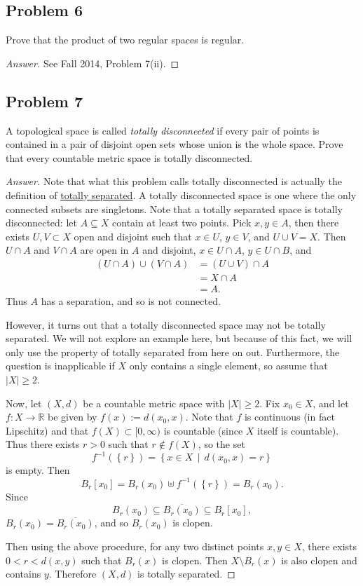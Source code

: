 \documentclass[12pt]{article}
\newcommand{\real}{\mathbb{R}}
\newcommand{\ita}[1]{\textit{#1}}
\newcommand\inv[1]{#1^{-1}}
\newcommand\paren[1]{\left( #1 \right)}
\newcommand\setb[1]{\left \{ #1 \right \}}
\newcommand{\sqbrack}[1]{\left [ #1 \right ]}
\theoremstyle{definition}
\begin{document}
\subsection{Problem 6}
Prove that the product of two regular spaces is regular.
\begin{proof}[Answer]
    See Fall 2014, Problem 7(ii).
\end{proof}
\subsection{Problem 7 \texorpdfstring{\cite{Arthur}}{}}
A topological space is called \ita{totally disconnected} if every pair of points is contained in a pair of disjoint open sets whose union is the whole space. Prove that every countable metric space is totally disconnected.
\begin{proof}[Answer]
    Note that what this problem calls totally disconnected is actually the definition of \underline{totally separated}. A totally disconnected space is one where the only connected subsets are singletons. Note that a totally separated space is totally disconnected: let $A \subseteq X$ contain at least two points. Pick $x , y \in A$, then there exists $U , V \subset X$ open and disjoint such that $x \in U$, $y \in V$, and $U \cup V = X$. Then $U \cap A$ and $V \cap A$ are open in $A$ and disjoint, $x \in U \cap A$, $y \in U \cap B$, and 
    \begin{align*}
        \paren{ U \cap A } \cup \paren{ V \cap A } & = \paren{ U \cup V } \cap A \\
        & = X \cap A \\
        & = A.
    \end{align*}
    Thus $A$ has a separation, and so is not connected. 
    
    However, it turns out that a totally disconnected space may not be totally separated. We will not explore an example here, but because of this fact, we will only use the property of totally separated from here on out. Furthermore, the question is inapplicable if $X$ only contains a single element, so assume that $|X| \geq 2$.
    
    Now, let $(X,d)$ be a countable metric space with $|X| \geq 2$. Fix $x_0 \in X$, and let $f : X \to \real$ be given by $f(x) := d \paren{ x_0 , x }$. Note that $f$ is continuous (in fact Lipschitz) and that $f(X) \subset [0,\infty)$ is countable (since $X$ itself is countable). Thus there exists $r > 0$ such that $r \notin f(X)$, so the set 
    \[
        \inv{f} \paren{ \setb{ r } } = \setb{ x \in X \, \middle| \, d \paren{ x_0 , x } = r }
    \]
    is empty. Then 
    \[
        B_r \sqbrack{ x_0 } = B_r \paren{ x_0 } \uplus \inv{f} \paren{ \setb{ r } } = B_r \paren{ x_0 }.
    \]
    Since 
    \[
        B_r \paren{ x_0 } \subseteq \overline{ B_r \paren{ x_0 } } \subseteq B_r \sqbrack{ x_0 },
    \]
    $B_r \paren{ x_0 } = \overline{B_r \paren{ x_0 }}$, and so $B_r \paren{ x_0 }$ is clopen. 
    
    Then using the above procedure, for any two distinct points $x , y \in X$, there exists $0 < r < d(x,y)$ such that $B_r(x)$ is clopen. Then $X \setminus B_r(x)$ is also clopen and contains $y$. Therefore $(X,d)$ is totally separated. 
\end{proof}
\end{document}
